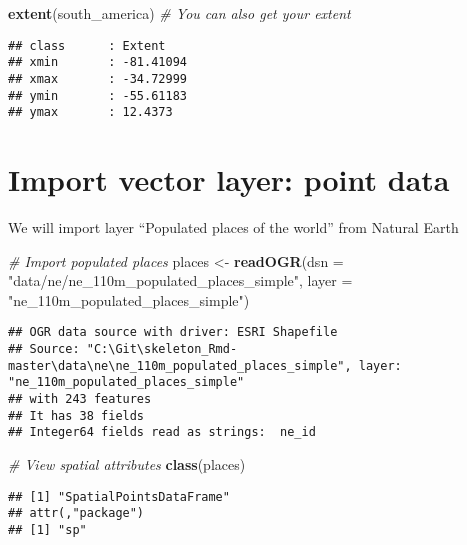 \documentclass[]{book}
\newenvironment{Shaded}{\begin{snugshade}}{\end{snugshade}}
\newcommand{\CommentTok}[1]{\textcolor[rgb]{0.56,0.35,0.01}{\textit{#1}}}
\newcommand{\DataTypeTok}[1]{\textcolor[rgb]{0.13,0.29,0.53}{#1}}
\newcommand{\KeywordTok}[1]{\textcolor[rgb]{0.13,0.29,0.53}{\textbf{#1}}}
\newcommand{\NormalTok}[1]{#1}
\newcommand{\StringTok}[1]{\textcolor[rgb]{0.31,0.60,0.02}{#1}}
\begin{document}
\begin{Shaded}
\begin{Highlighting}[]
\KeywordTok{extent}\NormalTok{(south_america)  }\CommentTok{# You can also get your extent}
\end{Highlighting}
\end{Shaded}

\begin{verbatim}
## class      : Extent 
## xmin       : -81.41094 
## xmax       : -34.72999 
## ymin       : -55.61183 
## ymax       : 12.4373
\end{verbatim}

\hypertarget{import-vector-layer-point-data}{%
\section{Import vector layer: point data}\label{import-vector-layer-point-data}}

We will import layer ``Populated places of the world'' from Natural Earth

\begin{Shaded}
\begin{Highlighting}[]
\CommentTok{# Import populated places}
\NormalTok{places <-}\StringTok{ }\KeywordTok{readOGR}\NormalTok{(}\DataTypeTok{dsn =} \StringTok{"data/ne/ne_110m_populated_places_simple"}\NormalTok{, }\DataTypeTok{layer =} \StringTok{"ne_110m_populated_places_simple"}\NormalTok{)}
\end{Highlighting}
\end{Shaded}

\begin{verbatim}
## OGR data source with driver: ESRI Shapefile 
## Source: "C:\Git\skeleton_Rmd-master\data\ne\ne_110m_populated_places_simple", layer: "ne_110m_populated_places_simple"
## with 243 features
## It has 38 fields
## Integer64 fields read as strings:  ne_id
\end{verbatim}

\begin{Shaded}
\begin{Highlighting}[]
\CommentTok{# View spatial attributes}
\KeywordTok{class}\NormalTok{(places)}
\end{Highlighting}
\end{Shaded}

\begin{verbatim}
## [1] "SpatialPointsDataFrame"
## attr(,"package")
## [1] "sp"
\end{verbatim}
\end{document}
